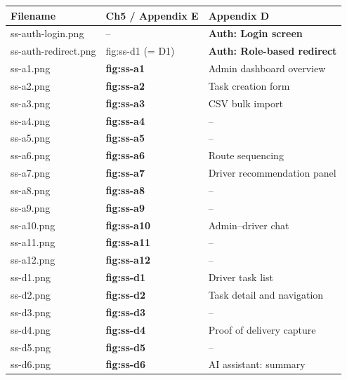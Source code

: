 \documentclass[11pt,a4paper]{article}
\newcommand{\filesave}[1]{{\ttfamily\small #1}}
\begin{document}
\begin{longtable}{@{}p{3.5cm} p{4.5cm} p{5.0cm}@{}}
  \toprule
  \textbf{Filename} & \textbf{Ch5 / Appendix E} & \textbf{Appendix D} \\
  \midrule
  \filesave{ss-auth-login.png}     & --                          & \textbf{Auth: Login screen} \\
  \filesave{ss-auth-redirect.png}  & fig:ss-d1 (= D1)           & \textbf{Auth: Role-based redirect} \\
  \filesave{ss-a1.png}             & \textbf{fig:ss-a1}          & Admin dashboard overview \\
  \filesave{ss-a2.png}             & \textbf{fig:ss-a2}          & Task creation form \\
  \filesave{ss-a3.png}             & \textbf{fig:ss-a3}          & CSV bulk import \\
  \filesave{ss-a4.png}             & \textbf{fig:ss-a4}          & -- \\
  \filesave{ss-a5.png}             & \textbf{fig:ss-a5}          & -- \\
  \filesave{ss-a6.png}             & \textbf{fig:ss-a6}          & Route sequencing \\
  \filesave{ss-a7.png}             & \textbf{fig:ss-a7}          & Driver recommendation panel \\
  \filesave{ss-a8.png}             & \textbf{fig:ss-a8}          & -- \\
  \filesave{ss-a9.png}             & \textbf{fig:ss-a9}          & -- \\
  \filesave{ss-a10.png}            & \textbf{fig:ss-a10}         & Admin--driver chat \\
  \filesave{ss-a11.png}            & \textbf{fig:ss-a11}         & -- \\
  \filesave{ss-a12.png}            & \textbf{fig:ss-a12}         & -- \\
  \filesave{ss-d1.png}             & \textbf{fig:ss-d1}          & Driver task list \\
  \filesave{ss-d2.png}             & \textbf{fig:ss-d2}          & Task detail and navigation \\
  \filesave{ss-d3.png}             & \textbf{fig:ss-d3}          & -- \\
  \filesave{ss-d4.png}             & \textbf{fig:ss-d4}          & Proof of delivery capture \\
  \filesave{ss-d5.png}             & \textbf{fig:ss-d5}          & -- \\
  \filesave{ss-d6.png}             & \textbf{fig:ss-d6}          & AI assistant: summary \\

\end{longtable}
\end{document}
